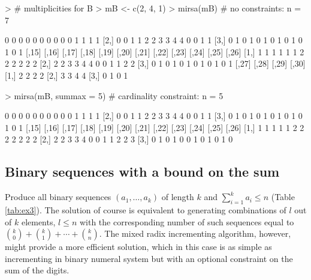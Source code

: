 \documentclass[12pt]{article}
\begin{document}
\begin{Schunk}
\begin{Sinput}
> # multiplicities for B
> mB <- c(2, 4, 1)
> mirsa(mB)                # no constraints: n = 7
\end{Sinput}
\begin{Soutput}
     [,1] [,2] [,3] [,4] [,5] [,6] [,7] [,8] [,9] [,10] [,11] [,12] [,13] [,14]
[1,]    0    0    0    0    0    0    0    0    0     0     1     1     1     1
[2,]    0    0    1    1    2    2    3    3    4     4     0     0     1     1
[3,]    0    1    0    1    0    1    0    1    0     1     0     1     0     1
     [,15] [,16] [,17] [,18] [,19] [,20] [,21] [,22] [,23] [,24] [,25] [,26]
[1,]     1     1     1     1     1     1     2     2     2     2     2     2
[2,]     2     2     3     3     4     4     0     0     1     1     2     2
[3,]     0     1     0     1     0     1     0     1     0     1     0     1
     [,27] [,28] [,29] [,30]
[1,]     2     2     2     2
[2,]     3     3     4     4
[3,]     0     1     0     1
\end{Soutput}
\begin{Sinput}
> mirsa(mB, summax = 5)    # cardinality constraint: n = 5 
\end{Sinput}
\begin{Soutput}
     [,1] [,2] [,3] [,4] [,5] [,6] [,7] [,8] [,9] [,10] [,11] [,12] [,13] [,14]
[1,]    0    0    0    0    0    0    0    0    0     0     1     1     1     1
[2,]    0    0    1    1    2    2    3    3    4     4     0     0     1     1
[3,]    0    1    0    1    0    1    0    1    0     1     0     1     0     1
     [,15] [,16] [,17] [,18] [,19] [,20] [,21] [,22] [,23] [,24] [,25] [,26]
[1,]     1     1     1     1     1     2     2     2     2     2     2     2
[2,]     2     2     3     3     4     0     0     1     1     2     2     3
[3,]     0     1     0     1     0     0     1     0     1     0     1     0
\end{Soutput}
\end{Schunk}

\subsection{Binary sequences with a bound on the sum}   

Produce all binary sequences $(a_1, \dotsc, a_k)$ of length $k$ and $\sum_{i = 1}^k a_i \leqslant n$ (Table \ref{tab:ex3}). The solution of course is equivalent to generating combinations of $l$ out of $k$ elements, $l \leqslant n$ with the corresponding number of such sequences equal to $\binom{k}{0} + \binom{k}{1} + \dotsb + \binom{k}{n}$. The mixed radix incrementing algorithm, however, might provide a more efficient solution, which in this case is as simple as incrementing in binary numeral system but with an optional constraint on the sum of the digits. \\ 
\end{document}

